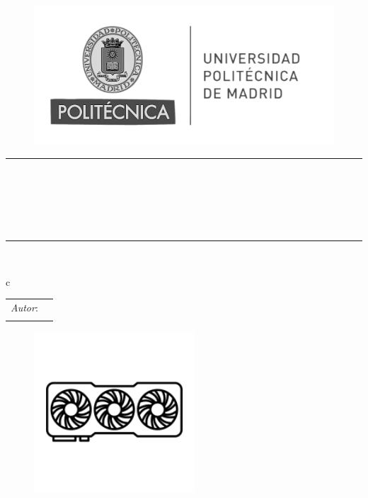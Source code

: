 \begin{titlepage}
	\begin{center}
		\vspace*{0in}
		\begin{figure}[htb]
			\centering
			\includegraphics[width = 0.6\linewidth]{./Figures/Portada_HF/upm_logo.png}
		\end{figure}
		
		\vspace*{0.2in}
		\rule{\linewidth}{0.4mm}\\
		\vspace*{0.1in}
		\begin{huge}
			\textbf{\scshape{\ProjectTitle}} \\
		\end{huge}
		\vspace*{0.1in}
		\begin{large}
			\begin{normalsize}
				\scshape{\Project}\\
				\scshape{\ProjectSubject}
			\end{normalsize}
		\end{large} 
		\vspace*{0.1in}
		\rule{\linewidth}{0.4mm}\\
		\vspace*{0.1in}
		\begin{large}
			\begin{tabular}{c}
				\\
				\begin{tabular}{ l l }
					\textit{Autor}: & \ProjectAutor     \\
					                &                   \\
				\end{tabular}
				
				
			\end{tabular}
		\end{large}

\begin{figure}[H]
	\centering
	\includegraphics[width=60mm]{Figures/Imagenes/gpu.png}
\end{figure}


\end{center}
\end{titlepage}
